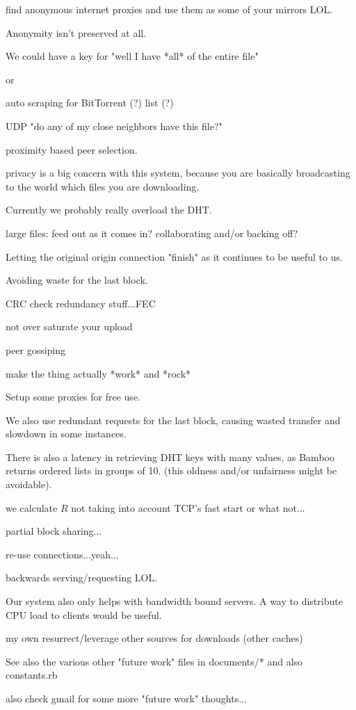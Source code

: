 find anonymous internet proxies and use them as some of your mirrors LOL.

Anonymity isn't preserved at all.

We could have a key for "well I have *all* of the entire file"

or 

auto scraping for BitTorrent (?) list (?)

UDP "do any of my close neighbors have this file?"

proximity based peer selection.

privacy is a big concern with this system, because you are basically broadcasting to the world which files you are downloading.

Currently we probably really overload the DHT.

large files: feed out as it comes in?
 collaborating and/or backing off?
 
Letting the original origin connection "finish" as it continues to be useful to us.

Avoiding waste for the last block. 
 
CRC check redundancy stuff...FEC

not over saturate your upload

peer gossiping

make the thing actually *work* and *rock*

Setup some proxies for free use.

We also use redundant requests for the last block, causing wasted transfer and slowdown in some instances.  

There is also a latency in retrieving DHT keys with many values, as Bamboo returns ordered lists in groups of 10.
(this oldness and/or unfairness might be avoidable).

we calculate $R$ not taking into account TCP's fast start or what not...

partial block sharing...

re-use connections...yeah...

backwards serving/requesting LOL.

Our system also only helps with bandwidth bound servers.  A way to distribute CPU load to clients would be useful.


my own resurrect/leverage other sources for downloads (other caches)

See also the various other "future work" files in documents/* and also constants.rb

also check gmail for some more "future work" thoughts...